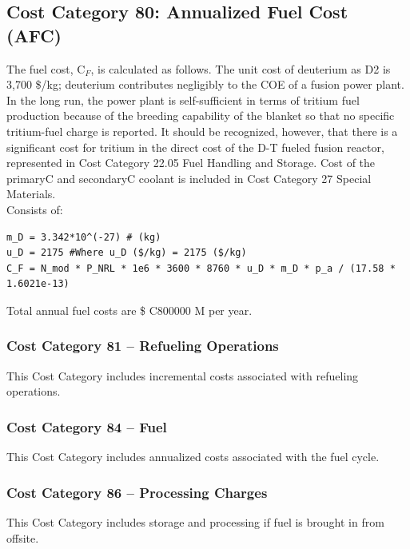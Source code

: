 \subsection{Cost Category 80: Annualized Fuel Cost (AFC)}

The fuel cost, C$_{F}$, is calculated as follows.  The unit cost of deuterium as D2 is 3,700 \$/kg; deuterium contributes negligibly to the COE of a fusion power plant. In the long run, the power plant is self-sufficient in terms of tritium fuel production because of the breeding capability of the blanket so that no specific tritium-fuel charge is reported. It should be recognized, however, that there is a significant cost for tritium in the direct cost of the D-T fueled fusion reactor, represented in Cost Category 22.05 Fuel Handling and Storage. Cost of the primaryC and secondaryC coolant is included in Cost Category 27 Special Materials.\\

Consists of:  
\begin{verbatim} 
m_D = 3.342*10^(-27) # (kg)
u_D = 2175 #Where u_D ($/kg) = 2175 ($/kg) 
C_F = N_mod * P_NRL * 1e6 * 3600 * 8760 * u_D * m_D * p_a / (17.58 * 1.6021e-13)
\end{verbatim} 

Total annual fuel costs are \$ C800000 M per year.

\subsubsection*{Cost Category 81 – Refueling Operations}
This Cost Category includes incremental costs associated with refueling operations.

\subsubsection*{Cost Category 84 – Fuel}
This Cost Category includes annualized costs associated with the fuel cycle.

\subsubsection*{Cost Category 86 – Processing Charges}
This Cost Category includes storage and processing if fuel is brought in from offsite.

